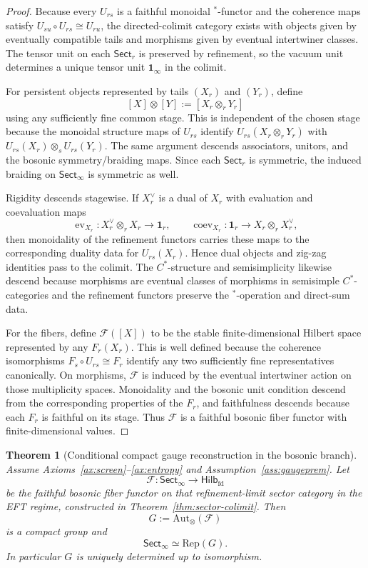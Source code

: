 \documentclass[11pt]{article}
\newtheorem{theorem}{Theorem}[section]
\begin{document}
\begin{proof}
Because every \(U_{rs}\) is a faithful monoidal \(^*\)-functor and the coherence maps satisfy \(U_{su}\!\circ U_{rs}\cong U_{ru}\), the directed-colimit category exists with objects given by eventually compatible tails and morphisms given by eventual intertwiner classes. The tensor unit on each \(\mathsf{Sect}_r\) is preserved by refinement, so the vacuum unit determines a unique tensor unit \(\mathbf 1_\infty\) in the colimit.

For persistent objects represented by tails \((X_r)\) and \((Y_r)\), define
\[
[X]\otimes [Y]:=[X_r\otimes_r Y_r]
\]
using any sufficiently fine common stage. This is independent of the chosen stage because the monoidal structure maps of \(U_{rs}\) identify \(U_{rs}(X_r\otimes_r Y_r)\) with \(U_{rs}(X_r)\otimes_s U_{rs}(Y_r)\). The same argument descends associators, unitors, and the bosonic symmetry/braiding maps. Since each \(\mathsf{Sect}_r\) is symmetric, the induced braiding on \(\mathsf{Sect}_\infty\) is symmetric as well.

Rigidity descends stagewise. If \(X_r^\vee\) is a dual of \(X_r\) with evaluation and coevaluation maps
\[
\operatorname{ev}_{X_r}:X_r^\vee\otimes_r X_r\to \mathbf 1_r,
\qquad
\operatorname{coev}_{X_r}:\mathbf 1_r\to X_r\otimes_r X_r^\vee,
\]
then monoidality of the refinement functors carries these maps to the corresponding duality data for \(U_{rs}(X_r)\). Hence dual objects and zig-zag identities pass to the colimit. The \(C^*\)-structure and semisimplicity likewise descend because morphisms are eventual classes of morphisms in semisimple \(C^*\)-categories and the refinement functors preserve the \(^*\)-operation and direct-sum data.

For the fibers, define \(\mathcal F([X])\) to be the stable finite-dimensional Hilbert space represented by any \(F_r(X_r)\). This is well defined because the coherence isomorphisms \(F_s\!\circ U_{rs}\cong F_r\) identify any two sufficiently fine representatives canonically. On morphisms, \(\mathcal F\) is induced by the eventual intertwiner action on those multiplicity spaces. Monoidality and the bosonic unit condition descend from the corresponding properties of the \(F_r\), and faithfulness descends because each \(F_r\) is faithful on its stage. Thus \(\mathcal F\) is a faithful bosonic fiber functor with finite-dimensional values.
\end{proof}

\begin{theorem}[Conditional compact gauge reconstruction in the bosonic branch]\label{thm:compactgauge}
Assume Axioms~\ref{ax:screen}--\ref{ax:entropy} and Assumption~\ref{ass:gaugeprem}. Let
\[
\mathcal F:\mathsf{Sect}_\infty\to\mathsf{Hilb}_{\mathrm{fd}}
\]
be the faithful bosonic fiber functor on that refinement-limit sector category in the EFT regime, constructed in Theorem~\ref{thm:sector-colimit}. Then
\[
G:=\mathrm{Aut}_\otimes(\mathcal F)
\]
is a compact group and
\[
\mathsf{Sect}_\infty\simeq \mathrm{Rep}(G).
\]
In particular \(G\) is uniquely determined up to isomorphism.
\end{theorem}
\end{document}
